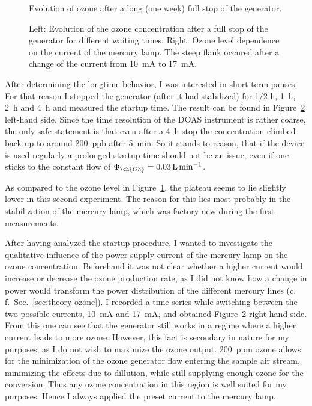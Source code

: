 \begin{figure}[htbp]
  \centering
  
  \caption{Evolution of ozone after a long (one week) full stop of the
    generator.}
  \label{fig:long-stop}
\end{figure}
\begin{figure}[htbp]
  \centering
  
  \hfill
  
  \caption{Left: Evolution of the ozone concentration after a full stop of the
    generator for different waiting times. Right: Ozone level
    dependence on the current of the mercury lamp. The steep
    flank occured after a change of the current from
    \SI{10}{\milli\ampere} to \SI{17}{\milli\ampere}.}
  \label{fig:multiple-stop}
\end{figure}

After determining the longtime behavior, I was interested in
short term pauses. For that reason I stopped the generator (after it
had stabilized) for {\nfrac{} 1/2} \si{\hour}, \SI{1}{\hour},
\SI{2}{\hour} and \SI{4}{\hour} and measured the startup time. The
result can be found in Figure~\ref{fig:multiple-stop}
left-hand side. Since the time resolution of the DOAS instrument is
rather coarse, the only safe statement is that even after a
\SI{4}{\hour} stop the concentration climbed back up to around
\SI{200}{ppb} after \SI{5}{\minute}. So it stands to reason, that if
the device is used regularly a prolonged startup time should not be an
issue, even if one sticks to the constant flow of $\Phi_{\ch{O3}} =
\SI{0.03}{\liter\per\minute}$.

As compared to the ozone level in Figure~\ref{fig:long-stop}, the
plateau seems to lie slightly lower in this second experiment. The
reason for this lies most probably in the stabilization of the mercury
lamp, which was factory new during the first measurements.

After having analyzed the startup procedure, I wanted to investigate
the qualitative influence of the power supply current of the mercury
lamp on the ozone concentration. Beforehand it was not clear whether a
higher current would increase or decrease the ozone production rate,
as I did not know how a change in power would transform the power
distribution of the different mercury lines (c.\,f.\
Sec.~\ref{sec:theory-ozone}). I recorded a time series while switching
between the two possible currents, \SI{10}{\milli\ampere} and
\SI{17}{\milli\ampere}, and obtained Figure~\ref{fig:multiple-stop}
right-hand side. From this one can see that the generator still works
in a regime where a higher current leads to more ozone. However, this
fact is secondary in nature for my purposes, as I do not wish to
maximize the ozone output. \SI{200}{ppm} ozone allows for the
minimization of the ozone generator flow entering the sample air
stream, minimizing the effects due to dillution, while still supplying
enough ozone for the conversion. Thus any ozone concentration in this
region is well suited for my purposes. Hence I always applied the
preset current to the mercury lamp.

